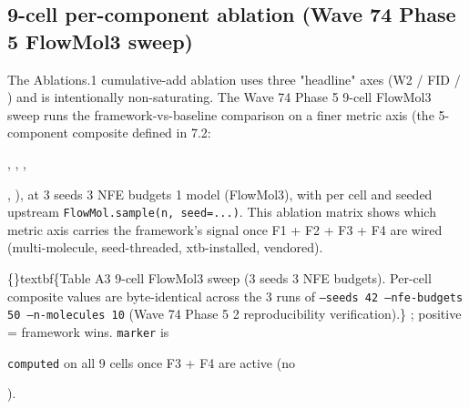 \documentclass{article}
\begin{document}
\subsection{9-cell per-component ablation (Wave 74 Phase 5 FlowMol3 sweep)}
The Ablations.1 cumulative-add ablation uses three "headline" axes (W2 / FID / ) and is intentionally non-saturating. The Wave 74 Phase 5 9-cell FlowMol3 sweep runs the framework-vs-baseline comparison on a finer metric axis (the 5-component composite defined in 7.2:

, , ,

, ), at 3 seeds  3 NFE budgets  1 model (FlowMol3), with  per cell and seeded upstream \texttt{FlowMol.sample(n, seed=...)}. This ablation matrix shows which metric axis carries the framework's signal once F1 + F2 + F3 + F4 are wired (multi-molecule, seed-threaded, xtb-installed,  vendored).

\{\}textbf\{Table A3  9-cell FlowMol3 sweep (3 seeds  3 NFE budgets). Per-cell composite values are byte-identical across the 3 runs of \texttt{--seeds 42 --nfe-budgets 50 --n-molecules 10} (Wave 74 Phase 5 2 reproducibility verification).\} ; positive = framework wins. \texttt{marker} is

\texttt{computed} on all 9 cells once F3 + F4 are active (no

).
\end{document}
